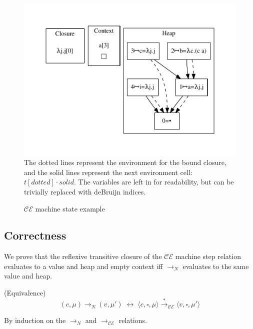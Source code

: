 \begin{figure}
\includegraphics[width=\linewidth]{figures/18.pdf}
The dotted lines represent the environment for the bound closure, and the solid
lines represent the next environment cell:  $t[dotted] \cdot solid$. The
variables are left in for readability, but can be trivially replaced with
deBruijn indices. 

\caption{$\mathcal{CE}$ machine state example}
\label{fig:state}
\end{figure}

\subsection{Correctness}
We prove that the reflexive transitive closure of the $\mathcal{CE}$ machine
step relation evaluates to a value and heap and empty context iff
$\xrightarrow{}_{N}$ evaluates to the same value and heap.

{\theorem \textnormal{(Equivalence)} $$(c, \mu) \rightarrow_{N} (v, \mu') \;
\leftrightarrow \; \langle c, \square, \mu \rangle \xrightarrow{*
}_{\mathcal{CE}} \langle v, \square, \mu' \rangle $$} 

By induction on the $\rightarrow_{N}$ and $\rightarrow_{\mathcal{CE}}$ relations.

